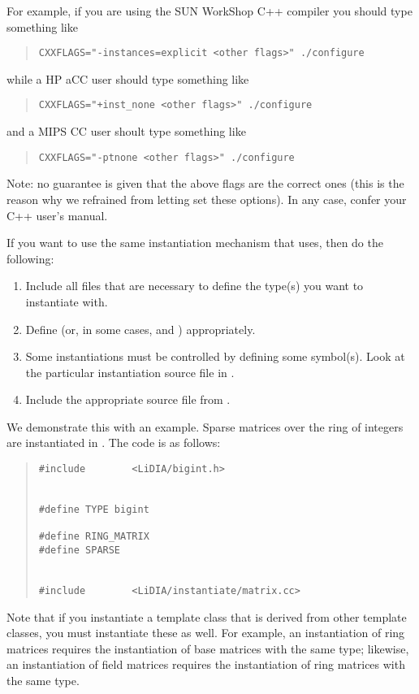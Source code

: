 For example, if you are using the SUN WorkShop C++ compiler you should type
something like
\begin{quote}
\begin{verbatim}
CXXFLAGS="-instances=explicit <other flags>" ./configure
\end{verbatim}
\end{quote}
while a HP aCC user should type something like
\begin{quote}
\begin{verbatim}
CXXFLAGS="+inst_none <other flags>" ./configure
\end{verbatim}
\end{quote}
and a MIPS CC user shoult type something like
\begin{quote}
\begin{verbatim}
CXXFLAGS="-ptnone <other flags>" ./configure
\end{verbatim}
\end{quote}
Note: no guarantee is given that the above flags are the correct ones (this
is the reason why we refrained from letting  set these
options).  In any case, confer your C++ user's manual.

If you want to use the same instantiation mechanism that \LiDIA uses, then
do the following:
\begin{enumerate}
\item Include all files that are necessary to define the type(s) you want
to instantiate with.
\item Define  (or, in some cases,  and )
appropriately.
\item Some instantiations must be controlled by defining some symbol(s).
Look at the particular instantiation source file in
.
\item Include the appropriate source file from
.
\end{enumerate}
We demonstrate this with an example.  Sparse matrices over the ring of
integers are instantiated in
.  The code is as
follows:
\begin{quote}
\begin{verbatim}
#include        <LiDIA/bigint.h>


#define TYPE bigint

#define RING_MATRIX
#define SPARSE


#include        <LiDIA/instantiate/matrix.cc>
\end{verbatim}
\end{quote}
Note that if you instantiate a template class that is derived from other
template classes, you must instantiate these as well.  For example, an
instantiation of ring matrices requires the instantiation of base matrices
with the same type; likewise, an instantiation of field matrices requires
the instantiation of ring matrices with the same type.


